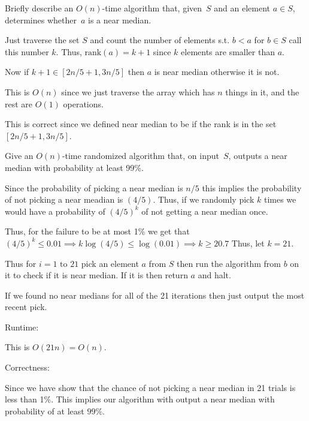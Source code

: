 \documentclass[12pt, letterpaper]{article}
\renewcommand{\t}[1]{\text{#1}}
\begin{document}
\begin{subproblem}{}
  Briefly describe an $O(n)$-time algorithm that, given~$S$ and an element $a \in S$, determines whether~$a$ is a near median.
\end{subproblem}
\begin{problemproof}
  Just traverse the set $S$ and count the number of elements s.t. $b < a$ for $b \in S$ call this number $k$. Thus, $\t{rank}(a)=k+1$ since $k$ elements are smaller than $a$.

  Now if $k+1 \in [2n/5+1,3n/5]$ then $a$ is near median otherwise it is not.

  This is $O(n)$ since we just traverse the array which has $n$ things in it, and the rest are $O(1)$ operations.

  This is correct since we defined near median to be if the rank is in the set $[2n/5+1,3n/5]$.
\end{problemproof}

\begin{subproblem}{}
  Give an $O(n)$-time randomized algorithm that, on input~$S$, outputs a near median with probability at least 99\%.
\end{subproblem}
\begin{problemproof}
  Since the probability of picking a near median is $n/5$ this implies the probability of not picking a near meadian is $(4/5)$. Thus, if we randomly pick $k$ times we would have a probability of $(4/5)^k$ of not getting a near median once.

  Thus, for the failure to be at most 1\% we get that $(4/5)^k \leq 0.01 \implies k \log(4/5) \leq \log(0.01) \implies k \geq 20.7$ Thus, let $k=21$.

  Thus for $i=1 \t{ to } 21$ pick an element $a$ from $S$ then run the algorithm from $b$ on it to check if it is near median. If it is then return $a$ and halt.

  If we found no near medians for all of the 21 iterations then just output the most recent pick.

  Runtime:

  This is $O(21n)=O(n)$.

  Correctness:

  Since we have show that the chance of not picking a near median in 21 trials is less than 1\%. This implies our algorithm with output a near median with probability of at least $99\%$.
\end{problemproof}
\end{document}
